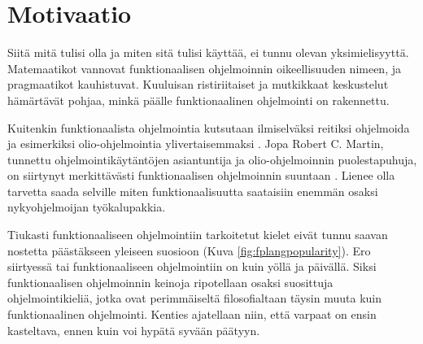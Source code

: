 
\chapter{Motivaatio}

Siitä mitä  tulisi olla ja miten sitä tulisi käyttää, ei tunnu olevan yksimielisyyttä. Matemaatikot vannovat funktionaalisen ohjelmoinnin oikeellisuuden nimeen, ja pragmaatikot kauhistuvat. Kuuluisan ristiriitaiset ja mutkikkaat keskustelut hämärtävät pohjaa, minkä päälle funktionaalinen ohjelmointi on rakennettu. \citep{stackoverflow_what_monad,stackoverflow:why_monad,promises-spec-94}

Kuitenkin funktionaalista ohjelmointia kutsutaan ilmiselväksi reitiksi ohjelmoida ja esimerkiksi olio-ohjelmointia ylivertaisemmaksi \cite[1]{the_oo_way}. Jopa Robert C. Martin, tunnettu ohjelmointikäytäntöjen asiantuntija ja olio-ohjelmoinnin puolestapuhuja, on siirtynyt merkittävästi funktionaalisen ohjelmoinnin suuntaan \cite{martin2019whyclojure,martin2017pragmaticfp}. Lienee olla tarvetta saada selville miten funktionaalisuutta saataisiin enemmän osaksi nykyohjelmoijan työkalupakkia.

Tiukasti funktionaaliseen ohjelmointiin tarkoitetut kielet eivät tunnu saavan nostetta päästäkseen yleiseen suosioon (Kuva \ref{fig:fplangpopularity}). Ero siirtyessä  tai  funktionaaliseen ohjelmointiin on kuin yöllä ja päivällä. Siksi funktionaalisen ohjelmoinnin keinoja ripotellaan osaksi suosittuja ohjelmointikieliä, jotka ovat perimmäiseltä filosofialtaan täysin muuta kuin funktionaalinen ohjelmointi. Kenties ajatellaan niin, että varpaat on ensin kasteltava, ennen kuin voi hypätä syvään päätyyn.

